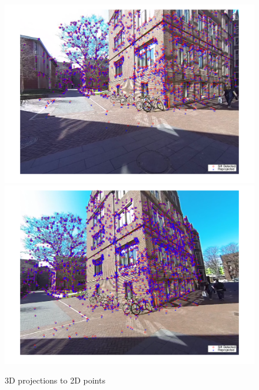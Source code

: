 \documentclass[10pt,letterpaper]{article}
\begin{document}
\begin{enumerate}[]
\begin{figure}[h!]
 \center
  \includegraphics[width=5in]{../images/final-img1}
  \includegraphics[width=5in]{../images/final-img2}
  \caption
   {3D projections to 2D points}
\end{figure} \\


\end{enumerate}
\end{document}

